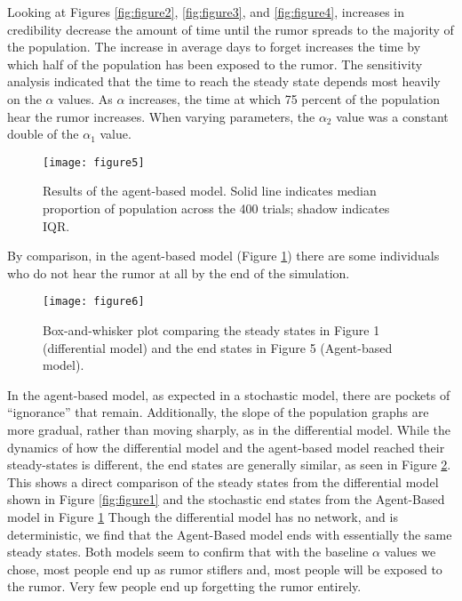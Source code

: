 Looking at Figures \ref{fig:figure2}, \ref{fig:figure3}, and \ref{fig:figure4}, increases in credibility decrease the amount of time until the rumor spreads to the majority of the population. The increase in average days to forget increases the time by which half of the population has been exposed to the rumor. The sensitivity analysis indicated that the time to reach the steady state depends most heavily on the $\alpha$ values. As $ \alpha $ increases, the time at which 75 percent of the population hear the rumor increases. When varying parameters, the $ \alpha_2 $ value was a constant double of the $ \alpha_1 $ value.

\begin{figure}[H]
\captionsetup{width=0.8\textwidth}
\centering
    \texttt{[image: figure5]}
  \caption{ Results of the agent-based model. Solid line indicates median proportion of population across the 400 trials; shadow indicates IQR. }
  \label{fig:figure5}
\end{figure}
 
By comparison, in the agent-based model (Figure \ref{fig:figure5}) there are some individuals who do not hear the rumor at all by the end of the simulation.

\begin{figure}[H]
\captionsetup{width=0.8\textwidth}
\centering
    \texttt{[image: figure6]}
  \caption{ Box-and-whisker plot comparing the steady states in Figure 1 (differential model) and the end states in Figure 5 (Agent-based model). }
  \label{fig:figure6}
\end{figure}

In the agent-based model, as expected in a stochastic model, there are pockets of ``ignorance'' that remain. Additionally, the slope of the population graphs are more gradual, rather than moving sharply, as in the differential model. While the dynamics of how the differential model and the agent-based model reached their steady-states is  different, the end states are generally similar, as seen in Figure \ref{fig:figure6}. This shows a direct comparison of the steady states from the differential model shown in Figure \ref{fig:figure1} and the stochastic end states from the Agent-Based model in Figure \ref{fig:figure5}  Though the differential model has no network, and is deterministic, we find that the Agent-Based model ends with essentially the same steady states. Both models seem to confirm that with the baseline $\alpha$ values we chose, most people end up as rumor stiflers and, most people will be exposed to the rumor. Very few people end up forgetting the rumor entirely. 

